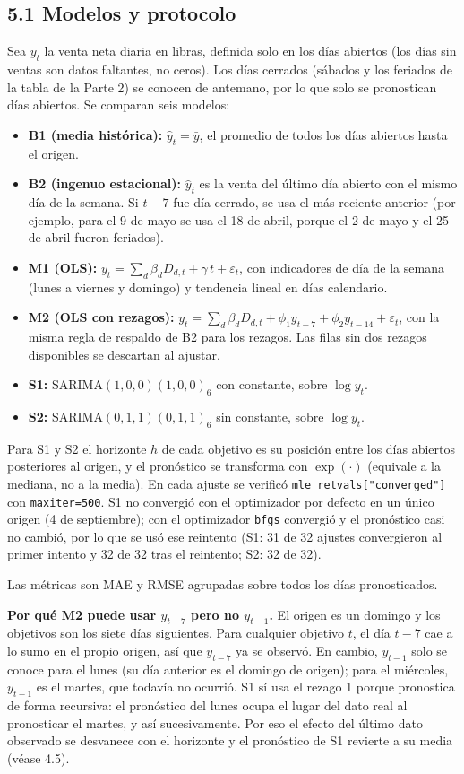 \documentclass[11pt]{article}
\begin{document}
\subsection*{5.1 Modelos y protocolo}
Sea $y_t$ la venta neta diaria en libras, definida solo en los días abiertos (los días sin ventas son datos faltantes, no ceros). Los días cerrados (sábados y los feriados de la tabla de la Parte 2) se conocen de antemano, por lo que solo se pronostican días abiertos. Se comparan seis modelos:
\begin{itemize}
  \item \textbf{B1 (media histórica):} $\hat y_t=\bar y$, el promedio de todos los días abiertos hasta el origen.
  \item \textbf{B2 (ingenuo estacional):} $\hat y_t$ es la venta del último día abierto con el mismo día de la semana. Si $t-7$ fue día cerrado, se usa el más reciente anterior (por ejemplo, para el 9 de mayo se usa el 18 de abril, porque el 2 de mayo y el 25 de abril fueron feriados).
  \item \textbf{M1 (OLS):} $y_t=\sum_{d}\beta_d D_{d,t}+\gamma\, t+\varepsilon_t$, con indicadores de día de la semana (lunes a viernes y domingo) y tendencia lineal en días calendario.
  \item \textbf{M2 (OLS con rezagos):} $y_t=\sum_d\beta_d D_{d,t}+\phi_1 y_{t-7}+\phi_2 y_{t-14}+\varepsilon_t$, con la misma regla de respaldo de B2 para los rezagos. Las filas sin dos rezagos disponibles se descartan al ajustar.
  \item \textbf{S1:} SARIMA$(1,0,0)(1,0,0)_6$ con constante, sobre $\log y_t$.
  \item \textbf{S2:} SARIMA$(0,1,1)(0,1,1)_6$ sin constante, sobre $\log y_t$.
\end{itemize}
Para S1 y S2 el horizonte $h$ de cada objetivo es su posición entre los días abiertos posteriores al origen, y el pronóstico se transforma con $\exp(\cdot)$ (equivale a la mediana, no a la media). En cada ajuste se verificó \texttt{mle\_retvals["converged"]} con \texttt{maxiter=500}. S1 no convergió con el optimizador por defecto en un único origen (4 de septiembre); con el optimizador \texttt{bfgs} convergió y el pronóstico casi no cambió, por lo que se usó ese reintento (S1: 31 de 32 ajustes convergieron al primer intento y 32 de 32 tras el reintento; S2: 32 de 32).

Las métricas son MAE y RMSE agrupadas sobre todos los días pronosticados.

\textbf{Por qué M2 puede usar $y_{t-7}$ pero no $y_{t-1}$.} El origen es un domingo y los objetivos son los siete días siguientes. Para cualquier objetivo $t$, el día $t-7$ cae a lo sumo en el propio origen, así que $y_{t-7}$ ya se observó. En cambio, $y_{t-1}$ solo se conoce para el lunes (su día anterior es el domingo de origen); para el miércoles, $y_{t-1}$ es el martes, que todavía no ocurrió. S1 sí usa el rezago 1 porque pronostica de forma recursiva: el pronóstico del lunes ocupa el lugar del dato real al pronosticar el martes, y así sucesivamente. Por eso el efecto del último dato observado se desvanece con el horizonte y el pronóstico de S1 revierte a su media (véase 4.5).
\end{document}
